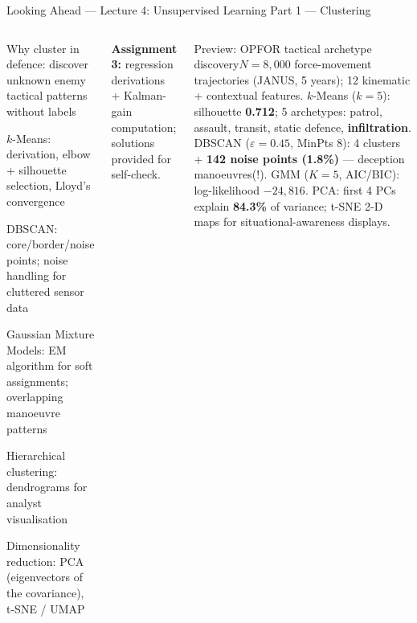 \documentclass[aspectratio=169,10pt,t]{beamer}
\begin{document}
\begin{frame}{Looking Ahead --- Lecture 4: Unsupervised Learning Part 1 --- Clustering}
\begin{columns}[T]
\begin{tl}\item Why cluster in defence: discover unknown enemy tactical patterns without labels\item $k$-Means: derivation, elbow + silhouette selection, Lloyd's convergence\item DBSCAN: core/border/noise points; noise handling for cluttered sensor data\item Gaussian Mixture Models: EM algorithm for soft assignments; overlapping manoeuvre patterns\item Hierarchical clustering: dendrograms for analyst visualisation\item Dimensionality reduction: PCA (eigenvectors of the covariance), t-SNE / UMAP\end{tl}
\begin{ibox}\scriptsize \textbf{Assignment 3:} regression derivations + Kalman-gain computation; solutions provided for self-check.\end{ibox}
\begin{cbox}{Preview: OPFOR tactical archetype discovery}\scriptsize $N=8{,}000$ force-movement trajectories (JANUS, 5 years); 12 kinematic + contextual features. $k$-Means ($k=5$): silhouette \textbf{0.712}; 5 archetypes: patrol, assault, transit, static defence, \textbf{infiltration}. DBSCAN ($\varepsilon=0.45$, MinPts 8): 4 clusters + \textbf{142 noise points (1.8\%)} --- deception manoeuvres(!). GMM ($K=5$, AIC/BIC): log-likelihood $-24{,}816$. PCA: first 4 PCs explain \textbf{84.3\%} of variance; t-SNE 2-D maps for situational-awareness displays.\end{cbox}
\end{columns}
\end{frame}
\end{document}
